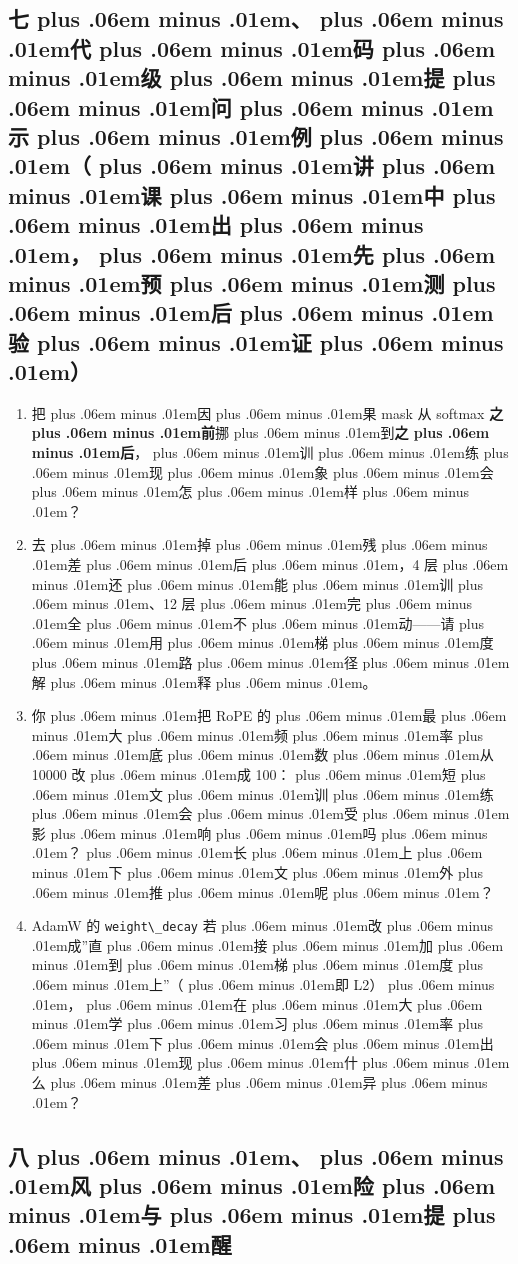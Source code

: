 \documentclass[
]{article}
\newcommand{\passthrough}[1]{#1}
\providecommand{\tightlist}{%
  \setlength{\itemsep}{0pt}\setlength{\parskip}{0pt}}
\def\zh#1{{\zhfont #1}}
\def\zhglue{\hskip0pt plus .06em minus .01em}
\begin{document}
\subsection{\zh{七\zhglue 、\zhglue 代\zhglue 码\zhglue 级\zhglue 提\zhglue 问\zhglue 示\zhglue 例\zhglue （\zhglue 讲\zhglue 课\zhglue 中\zhglue 出\zhglue ，\zhglue 先\zhglue 预\zhglue 测\zhglue 后\zhglue 验\zhglue 证\zhglue ）}}\label{ux4e03ux4ee3ux7801ux7ea7ux63d0ux95eeux793aux4f8bux8bb2ux8bfeux4e2dux51faux5148ux9884ux6d4bux540eux9a8cux8bc1}

\begin{enumerate}
\def\labelenumi{\arabic{enumi}.}
\tightlist
\item
  \zh{把\zhglue 因\zhglue 果} mask \zh{从} softmax \textbf{\zh{之\zhglue 前}}\zh{挪\zhglue 到}\textbf{\zh{之\zhglue 后}}\zh{，\zhglue 训\zhglue 练\zhglue 现\zhglue 象\zhglue 会\zhglue 怎\zhglue 样\zhglue ？}
\item
  \zh{去\zhglue 掉\zhglue 残\zhglue 差\zhglue 后\zhglue ，}4 \zh{层\zhglue 还\zhglue 能\zhglue 训\zhglue 、}12 \zh{层\zhglue 完\zhglue 全\zhglue 不\zhglue 动}------\zh{请\zhglue 用\zhglue 梯\zhglue 度\zhglue 路\zhglue 径\zhglue 解\zhglue 释\zhglue 。}
\item
  \zh{你\zhglue 把} RoPE \zh{的\zhglue 最\zhglue 大\zhglue 频\zhglue 率\zhglue 底\zhglue 数\zhglue 从} 10000 \zh{改\zhglue 成} 100\zh{：\zhglue 短\zhglue 文\zhglue 训\zhglue 练\zhglue 会\zhglue 受\zhglue 影\zhglue 响\zhglue 吗\zhglue ？\zhglue 长\zhglue 上\zhglue 下\zhglue 文\zhglue 外\zhglue 推\zhglue 呢\zhglue ？}
\item
  AdamW \zh{的} \passthrough{\lstinline!weight\_decay!} \zh{若\zhglue 改\zhglue 成}''\zh{直\zhglue 接\zhglue 加\zhglue 到\zhglue 梯\zhglue 度\zhglue 上}''\zh{（\zhglue 即} L2\zh{）\zhglue ，\zhglue 在\zhglue 大\zhglue 学\zhglue 习\zhglue 率\zhglue 下\zhglue 会\zhglue 出\zhglue 现\zhglue 什\zhglue 么\zhglue 差\zhglue 异\zhglue ？}
\end{enumerate}

\subsection{\zh{八\zhglue 、\zhglue 风\zhglue 险\zhglue 与\zhglue 提\zhglue 醒}}\label{ux516bux98ceux9669ux4e0eux63d0ux9192}
\end{document}
